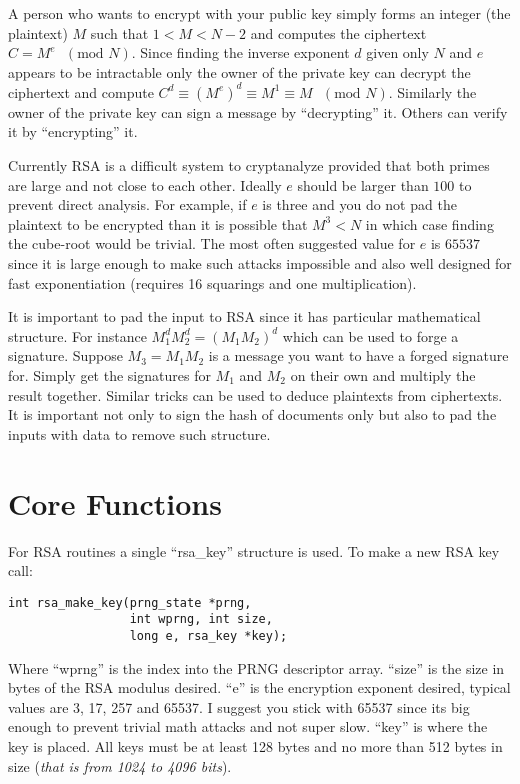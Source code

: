 \documentclass{book}
\begin{document}
A person who wants to encrypt with your public key simply forms an integer (the plaintext) $M$ such that 
$1 < M < N-2$ and computes the ciphertext $C = M^e\mbox{ }(\mbox{mod }N)$.  Since finding the inverse exponent $d$
given only $N$ and $e$ appears to be intractable only the owner of the private key can decrypt the ciphertext and compute
$C^d \equiv \left (M^e \right)^d \equiv M^1 \equiv M\mbox{ }(\mbox{mod }N)$.  Similarly the owner of the private key 
can sign a message by ``decrypting'' it.  Others can verify it by ``encrypting'' it.  

Currently RSA is a difficult system to cryptanalyze provided that both primes are large and not close to each other.  
Ideally $e$ should be larger than $100$ to prevent direct analysis.  For example, if $e$ is three and you do not pad
the plaintext to be encrypted than it is possible that $M^3 < N$ in which case finding the cube-root would be trivial.  
The most often suggested value for $e$ is $65537$ since it is large enough to make such attacks impossible and also well 
designed for fast exponentiation (requires 16 squarings and one multiplication).

It is important to pad the input to RSA since it has particular mathematical structure.  For instance  
$M_1^dM_2^d = (M_1M_2)^d$ which can be used to forge a signature.  Suppose $M_3 = M_1M_2$ is a message you want
to have a forged signature for.  Simply get the signatures for $M_1$ and $M_2$ on their own and multiply the result
together.  Similar tricks can be used to deduce plaintexts from ciphertexts.  It is important not only to sign 
the hash of documents only but also to pad the inputs with data to remove such structure.  

\section{Core Functions}

For RSA routines a single ``rsa\_key'' structure is used.  To make a new RSA key call:
\begin{verbatim}
int rsa_make_key(prng_state *prng, 
                 int wprng, int size, 
                 long e, rsa_key *key);
\end{verbatim}

Where ``wprng'' is the index into the PRNG descriptor array.  ``size'' is the size in bytes of the RSA modulus desired.
``e'' is the encryption exponent desired, typical values are 3, 17, 257 and 65537.  I suggest you stick with 65537 since its big
enough to prevent trivial math attacks and not super slow.  ``key'' is where the key is placed.  All keys must be at 
least 128 bytes and no more than 512 bytes in size (\textit{that is from 1024 to 4096 bits}).
\end{document}
